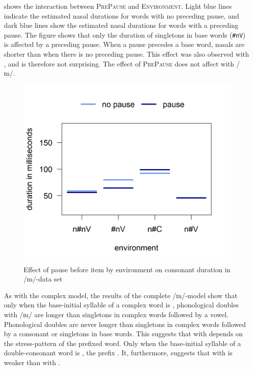 
 shows the interaction between \textsc{PrePause} and \textsc{Environment}. Light blue lines indicate the estimated nasal durations for words with no preceding pause, and dark blue lines show the estimated nasal durations for words with a preceding pause.
The figure shows that only the duration of singletons in base words (\texttt{\#nV}) is affected by a preceding pause. When a pause precedes a base word, nasals are shorter than when there is no preceding pause. This effect was also observed with , and is therefore not surprising. 
The effect of \textsc{PrePause} does not affect  with /ɪn/.



\begin{figure}
	
	
	
	\includegraphics [scale=0.5] {images/Experiment/InModelCompleteInterEnvPause}
	\caption{Effect of pause before item by environment on consonant duration in /ɪn/-data set}
	\label{fig:Env Pause In complete experiment}
\end{figure}	




As with the complex model, the results of the complete /ɪn/-model show that only when the base-initial syllable of a complex word is , phonological doubles with /ɪn/ are longer than singletons in complex words followed by a vowel. 
Phonological doubles are never longer than singletons in complex words followed by a consonant or singletons in base words. 
This suggests that  with  depends on the stress-pattern of the prefixed word.  Only when the base-initial syllable of a double-consonant word is , the prefix . It, furthermore, suggests that  with  is weaker than  with .


